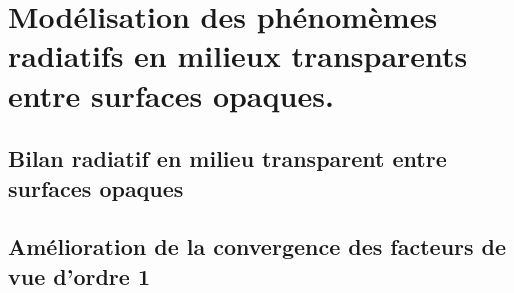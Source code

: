 \chapter{Modélisation des phénomèmes radiatifs en milieux transparents entre surfaces opaques.}
\label{part:c1}
\section{Bilan radiatif en milieu transparent entre surfaces opaques}








\section{Amélioration de la convergence des facteurs de vue d'ordre 1}

